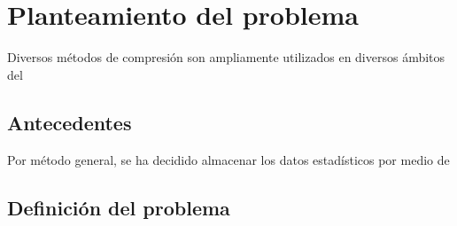 \section{Planteamiento del problema}

Diversos métodos de compresión son ampliamente utilizados en diversos ámbitos del

\subsection{Antecedentes}

Por método general, se ha decidido almacenar los datos estadísticos por medio de

\subsection{Definición del problema}
